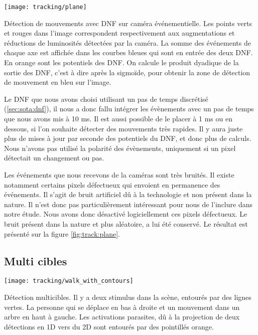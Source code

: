 	\begin{figureth}
		\begin{subfigureth}{\textwidth}
			\texttt{[image: tracking/plane]}
		\end{subfigureth}
		\caption[Détection de mouvements avec DNF sur caméra événementielle]{Détection de mouvements avec DNF sur caméra événementielle. Les points verts et rouges dans l'image correspondent respectivement aux augmentations et réductions de luminosités détectées par la caméra. La somme des événements de chaque axe est affichée dans les courbes bleues qui sont en entrée des deux DNF. En orange sont les potentiels des DNF. On calcule le produit dyadique de la sortie des DNF, c'est à dire après la sigmoïde, pour obtenir la zone de détection de mouvement en bleu sur l'image.}\label{fig:track:plane}
	\end{figureth}

	Le DNF que nous avons choisi utilisant un pas de temps discrétisé (\ref{sec:sota:dnf}), il nous a donc fallu intégrer les évènements avec un pas de temps que nous avons mis à 10 ms. Il est aussi possible de le placer à 1 ms ou en dessous, si l'on souhaite détecter des mouvements très rapides. Il y aura juste plus de mises à jour par seconde des potentiels du DNF, et donc plus de calculs. Nous n'avons pas utilisé la polarité des évènements, uniquement si un pixel détectait un changement ou pas.

	Les événements que nous recevons de la caméras sont très bruités. Il existe notamment certains pixels défectueux qui envoient en permanence des événements. Il s'agit de bruit artificiel dû à la technologie et non présent dans la nature. Il n'est donc pas particulièrement intéressant pour nous de l'inclure dans notre étude. Nous avons donc désactivé logiciellement ces pixels défectueux. Le bruit présent dans la nature et plus aléatoire, a lui été conservé. Le résultat est présenté sur la figure \ref{fig:track:plane}.

	\subsection{Multi cibles}

	\begin{figureth}
		\begin{subfigureth}{\textwidth}
			\texttt{[image: tracking/walk\_with\_contours]}
		\end{subfigureth}
		\caption[Détection de mouvements multicibles avec DNF sur caméra événementielle]{Détection multicibles. Il y a deux stimulus dans la scène, entourés par des lignes vertes. La personne qui se déplace en bas à droite et un mouvement dans un arbre en haut à gauche. Les activations parasites, dû à la projection de deux détections en 1D vers du 2D sont entourés par des pointillés orange.}\label{fig:track:multi}
	\end{figureth}


